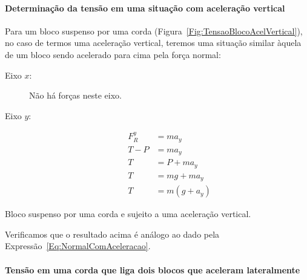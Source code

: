 \paragraph{Determinação da tensão em uma situação com aceleração vertical}

Para um bloco suspenso por uma corda (Figura~\ref{Fig:TensaoBlocoAcelVertical}), no caso de termos uma aceleração vertical, teremos uma situação similar àquela de um bloco sendo acelerado para cima pela força normal:
\begin{description}
    \item[Eixo $x$:] Não há forças neste eixo.
    \item[Eixo $y$:]
        \begin{align}
            F_R^y &= m a_y \\
            T - P &= m a_y \\
            T &= P + m a_y \\
            T &= mg + m a_y \\
            T &= m (g + a_y)
        \end{align}
\end{description}

\begin{marginfigure}[-3cm]
\centering
{}
\caption{Bloco suspenso por uma corda e sujeito a uma aceleração vertical. \label{Fig:TensaoBlocoAcelVertical}}
\end{marginfigure}

\noindent{}Verificamos que o resultado acima é análogo ao dado pela Expressão~\eqref{Eq:NormalComAceleracao}.

\paragraph{Tensão em uma corda que liga dois blocos que aceleram lateralmente}


